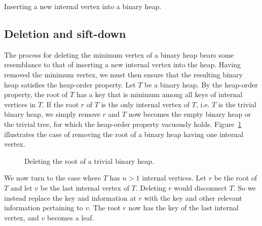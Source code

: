 \begin{algorithm}[!htbp]

\caption{Inserting a new internal vertex into a binary heap.}
\label{alg:tree_data_structures:binary_heap_insert}
\end{algorithm}



\subsection{Deletion and sift-down}
\label{subsec:tree_data_structures:deletion_sift_down}

The process for deleting the minimum vertex of a binary heap bears
some resemblance to that of inserting a new internal vertex into the
heap. Having removed the minimum vertex, we must then ensure that the
resulting binary heap satisfies the heap-order property. Let $T$ be a
binary heap. By the heap-order property, the root of $T$ has a key
that is minimum among all keys of internal vertices in $T$. If the
root $r$ of $T$ is the only internal vertex of $T$, i.e. $T$ is the
trivial binary heap, we simply remove $r$ and $T$ now becomes the
empty binary heap or the trivial tree, for which the heap-order
property vacuously holds.
Figure~\ref{fig:tree_data_structures:deleting_root_trivial_binary_heap}
illustrates the case of removing the root of a binary heap having one
internal vertex.

\begin{figure}[!htbp]
\centering

\caption{Deleting the root of a trivial binary heap.}
\label{fig:tree_data_structures:deleting_root_trivial_binary_heap}
\end{figure}

We now turn to the case where $T$ has $n > 1$ internal vertices. Let
$r$ be the root of $T$ and let $v$ be the last internal vertex of
$T$. Deleting $r$ would disconnect $T$. So we instead replace the key
and information at $r$ with the key and other relevant information
pertaining to $v$. The root $r$ now has the key of the last internal
vertex, and $v$ becomes a leaf.

